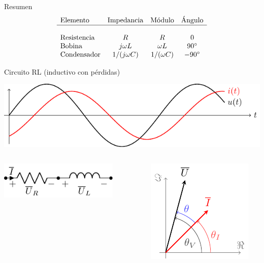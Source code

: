 \documentclass[aspectratio=169, usenames,svgnames,dvipsnames]{beamer}
\begin{document}
\begin{frame}[label={sec:orga9159c8}]{Resumen}
\[
  \begin{array}{lccc}
    \text{Elemento} & \text{Impedancia} & \text{Módulo} & \text{Ángulo}\\
    \hline\\
    \text{Resistencia} & R & R & 0\\
    \text{Bobina} & j \omega L & \omega L & \ang{90}\\
     \text{Condensador} & 1/(j \omega C) & 1/(\omega C) & \ang{-90}\\
  \end{array}
\]
\end{frame}
\begin{frame}[label={sec:orgfea33ec}]{Circuito RL (inductivo con pérdidas)}
\begin{center}
\includegraphics[height=0.25\textheight]{../figs/inductivo.pdf}
\end{center}
\begin{columns}
\begin{column}{0.45\columnwidth}
\begin{center}
\includegraphics[width=0.8\textwidth]{../figs/RL.pdf}
\end{center}
\end{column}


\begin{column}{0.55\columnwidth}
\begin{center}
\includegraphics[height=0.5\textheight]{../figs/fasorInductanciaReal_VI.pdf}
\end{center}
\end{column}
\end{columns}
\end{frame}
\end{document}
